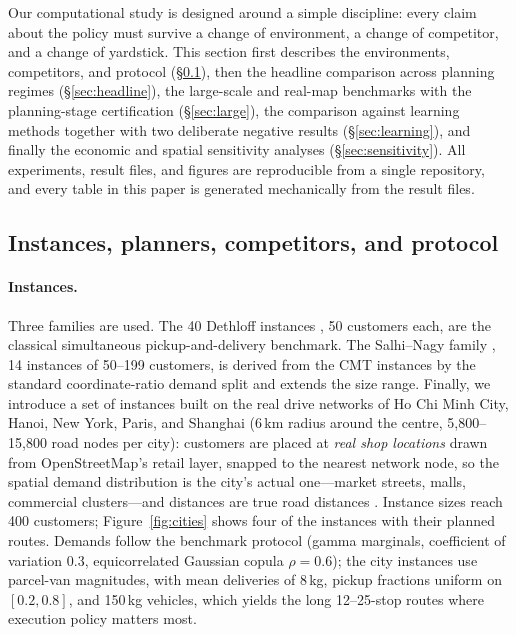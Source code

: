 \documentclass[preprint,authoryear,12pt]{elsarticle}
\theoremstyle{definition}
\theoremstyle{remark}
\begin{document}
Our computational study is designed around a simple discipline: every
claim about the policy must survive a change of environment, a change of
competitor, and a change of yardstick. This section first describes the
environments, competitors, and protocol (\S\ref{sec:setup}), then the
headline comparison across planning regimes (\S\ref{sec:headline}),
the large-scale and real-map benchmarks with the planning-stage
certification (\S\ref{sec:large}), the comparison against learning
methods together with two deliberate negative results
(\S\ref{sec:learning}), and finally the economic and spatial sensitivity
analyses (\S\ref{sec:sensitivity}). All experiments, result files, and
figures are reproducible from a single repository, and every table in
this paper is generated mechanically from the result files.

\subsection{Instances, planners, competitors, and protocol}
\label{sec:setup}

\paragraph{Instances.} Three families are used. The 40 Dethloff
instances \citep{dethloff2001vehicle}, 50 customers each, are the
classical simultaneous pickup-and-delivery benchmark. The Salhi--Nagy
family \citep{salhi1999cluster}, 14 instances of 50--199 customers, is
derived from the CMT instances \citep{christofides1979vehicle} by the
standard coordinate-ratio demand split and extends the size range.
Finally, we introduce a set of instances built on the real drive
networks of Ho Chi Minh City, Hanoi, New York, Paris, and Shanghai
(6\,km radius around the centre, 5{,}800--15{,}800 road nodes per city):
customers are placed at \emph{real shop locations} drawn from
OpenStreetMap's retail layer, snapped to the nearest network node, so
the spatial demand distribution is the city's actual one---market
streets, malls, commercial clusters---and distances are true road
distances \citep{boeing2017osmnx}. Instance sizes reach 400 customers;
Figure~\ref{fig:cities} shows four of the instances with their planned
routes. Demands follow the benchmark protocol (gamma marginals,
coefficient of variation $0.3$, equicorrelated Gaussian copula
$\rho = 0.6$); the city instances use parcel-van magnitudes, with mean
deliveries of 8\,kg, pickup fractions uniform on $[0.2, 0.8]$, and
150\,kg vehicles, which yields the long 12--25-stop routes where
execution policy matters most.
\end{document}

